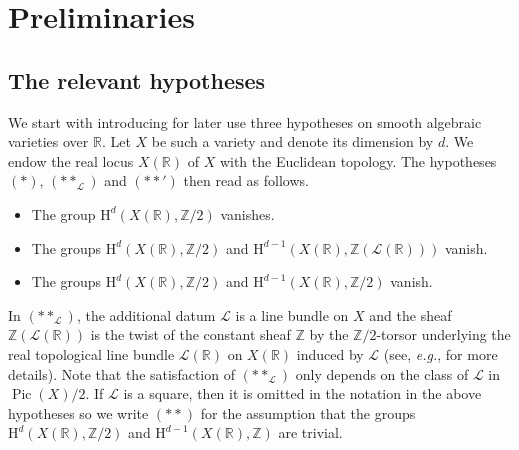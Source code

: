 \documentclass[11pt,leqno]{amsart}
\renewcommand{\1}{{\rm 1\hspace*{-0.4ex}%
\rule{0.1ex}{1.52ex}\hspace*{0.2ex}}}
\renewcommand{\Lc}{{\mathcal L}}
\newcommand{\Pic}{\operatorname{Pic}}
\newcommand{\Hr}{{\mathrm {H}}}
\newcommand{\<}[1]{{\langle}#1 {\rangle}}
\newcommand{\Rb}{\mathbb{R}}
\newcommand{\Zb}{\mathbb{Z}}
\newcounter{intro}
\theoremstyle{plain}
\theoremstyle{definition}
\theoremstyle{remark}
\numberwithin{equation}{section}
\begin{document}
\section{Preliminaries}\label{section:preliminaries}

\subsection{The relevant hypotheses}

We start with introducing for later use three hypotheses on smooth algebraic varieties over $\Rb$. Let $X$ be such a variety and denote its dimension by $d$. We endow the real locus $X(\Rb)$ of $X$ with the Euclidean topology. The hypotheses $(*)$, $(**_\Lc)$ and $(**')$ then read as follows.
\begin{itemize}
    \item[$(*)$] The group $\Hr^d(X(\Rb),\Zb/2)$ vanishes.
    \item[$(**_\Lc)$] The groups $\Hr^d(X(\Rb),\Zb/2)$ and $\Hr^{d-1}(X(\Rb),\Zb(\Lc(\Rb)))$ vanish.
    \item[$(**')$] The groups $\Hr^d(X(\Rb),\Zb/2)$ and $\Hr^{d-1}(X(\Rb),\Zb/2)$ vanish.
\end{itemize}
In $(**_\Lc)$, the additional datum $\Lc$ is a line bundle on $X$ and the sheaf $\Zb(\Lc(\Rb))$ is the twist of the constant sheaf $\Zb$ by the $\Zb/2$-torsor underlying the real topological line bundle $\Lc(\Rb)$ on $X(\Rb)$ induced by $\Lc$ (see, \emph{e.g.}, \cite[Example 2.3]{lerbetImageHigherSignature2026} for more details). Note that the satisfaction of $(**_\Lc)$ only depends on the class of $\Lc$ in $\Pic(X)/2$. If $\Lc$ is a square, then it is omitted in the notation in the above hypotheses so we write $(**)$ for the assumption that the groups $\Hr^d(X(\Rb),\Zb/2)$ and $\Hr^{d-1}(X(\Rb),\Zb)$ are trivial.
\end{document}
